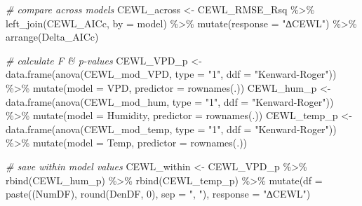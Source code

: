 \documentclass[
]{article}
\newenvironment{Shaded}{\begin{snugshade}}{\end{snugshade}}
\newcommand{\AttributeTok}[1]{\textcolor[rgb]{0.77,0.63,0.00}{#1}}
\newcommand{\CommentTok}[1]{\textcolor[rgb]{0.56,0.35,0.01}{\textit{#1}}}
\newcommand{\DecValTok}[1]{\textcolor[rgb]{0.00,0.00,0.81}{#1}}
\newcommand{\FunctionTok}[1]{\textcolor[rgb]{0.00,0.00,0.00}{#1}}
\newcommand{\NormalTok}[1]{#1}
\newcommand{\OtherTok}[1]{\textcolor[rgb]{0.56,0.35,0.01}{#1}}
\newcommand{\SpecialCharTok}[1]{\textcolor[rgb]{0.00,0.00,0.00}{#1}}
\newcommand{\StringTok}[1]{\textcolor[rgb]{0.31,0.60,0.02}{#1}}
\begin{document}
\begin{Shaded}
\begin{Highlighting}[]
\CommentTok{\# compare across models}
\NormalTok{CEWL\_across }\OtherTok{\textless{}{-}}\NormalTok{ CEWL\_RMSE\_Rsq }\SpecialCharTok{\%\textgreater{}\%}
  \FunctionTok{left\_join}\NormalTok{(CEWL\_AICc, }\AttributeTok{by =} \StringTok{\textquotesingle{}model\textquotesingle{}}\NormalTok{) }\SpecialCharTok{\%\textgreater{}\%}
  \FunctionTok{mutate}\NormalTok{(}\AttributeTok{response =} \StringTok{"∆CEWL"}\NormalTok{) }\SpecialCharTok{\%\textgreater{}\%}
  \FunctionTok{arrange}\NormalTok{(Delta\_AICc)}

\CommentTok{\# calculate F \& p{-}values}
\NormalTok{CEWL\_VPD\_p }\OtherTok{\textless{}{-}} \FunctionTok{data.frame}\NormalTok{(}\FunctionTok{anova}\NormalTok{(CEWL\_mod\_VPD, }
                              \AttributeTok{type =} \StringTok{"1"}\NormalTok{, }
                              \AttributeTok{ddf =} \StringTok{"Kenward{-}Roger"}\NormalTok{)) }\SpecialCharTok{\%\textgreater{}\%}
  \FunctionTok{mutate}\NormalTok{(}\AttributeTok{model =} \StringTok{\textquotesingle{}VPD\textquotesingle{}}\NormalTok{,}
         \AttributeTok{predictor =} \FunctionTok{rownames}\NormalTok{(.))}
\NormalTok{CEWL\_hum\_p }\OtherTok{\textless{}{-}} \FunctionTok{data.frame}\NormalTok{(}\FunctionTok{anova}\NormalTok{(CEWL\_mod\_hum, }
                              \AttributeTok{type =} \StringTok{"1"}\NormalTok{, }
                              \AttributeTok{ddf =} \StringTok{"Kenward{-}Roger"}\NormalTok{)) }\SpecialCharTok{\%\textgreater{}\%}
  \FunctionTok{mutate}\NormalTok{(}\AttributeTok{model =} \StringTok{\textquotesingle{}Humidity\textquotesingle{}}\NormalTok{,}
         \AttributeTok{predictor =} \FunctionTok{rownames}\NormalTok{(.))}
\NormalTok{CEWL\_temp\_p }\OtherTok{\textless{}{-}} \FunctionTok{data.frame}\NormalTok{(}\FunctionTok{anova}\NormalTok{(CEWL\_mod\_temp, }
                              \AttributeTok{type =} \StringTok{"1"}\NormalTok{, }
                              \AttributeTok{ddf =} \StringTok{"Kenward{-}Roger"}\NormalTok{)) }\SpecialCharTok{\%\textgreater{}\%}
  \FunctionTok{mutate}\NormalTok{(}\AttributeTok{model =} \StringTok{\textquotesingle{}Temp\textquotesingle{}}\NormalTok{,}
         \AttributeTok{predictor =} \FunctionTok{rownames}\NormalTok{(.))}

\CommentTok{\# save within model values}
\NormalTok{CEWL\_within }\OtherTok{\textless{}{-}}\NormalTok{ CEWL\_VPD\_p }\SpecialCharTok{\%\textgreater{}\%}
  \FunctionTok{rbind}\NormalTok{(CEWL\_hum\_p) }\SpecialCharTok{\%\textgreater{}\%}
  \FunctionTok{rbind}\NormalTok{(CEWL\_temp\_p) }\SpecialCharTok{\%\textgreater{}\%}
  \FunctionTok{mutate}\NormalTok{(}\AttributeTok{df =} \FunctionTok{paste}\NormalTok{((NumDF), }\FunctionTok{round}\NormalTok{(DenDF, }\DecValTok{0}\NormalTok{), }\AttributeTok{sep =} \StringTok{", "}\NormalTok{),}
         \AttributeTok{response =} \StringTok{"∆CEWL"}\NormalTok{)}
\end{Highlighting}
\end{Shaded}
\end{document}
